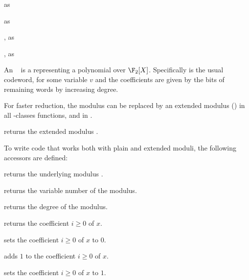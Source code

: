 as 

as 

, as

, as

 An ~ is a 
representing a polynomial over $\F_2[X]$. Specifically
 is the usual codeword,  for some
variable $v$ and the coefficients are given by the bits of remaining
words by increasing degree.


For faster reduction, the modulus  can be replaced by an extended
modulus () in all -classes functions, and in
.

 returns the extended modulus .

To write code that works both with plain and extended moduli, the following
accessors are defined:

 returns the underlying modulus .

 returns the variable number of the modulus.

 returns the degree of the modulus.


 returns the coefficient $i\ge 0$ of $x$.

 sets the coefficient $i\ge 0$ of $x$ to
$0$.

 adds $1$ to the coefficient $i\ge 0$ of $x$.

 sets the coefficient $i\ge 0$ of $x$ to $1$.







